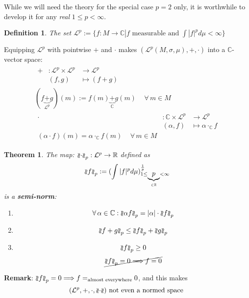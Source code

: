 \documentclass[10pt]{amsart}
\newtheorem{theorem}{Theorem}
\newtheorem{definition}{Definition}
\newcommand\dblwr{\wr\mkern-2mu\wr}
\newcommand{\seminorm}[1]{\mathopen{\dblwr}#1\mathclose{\dblwr}}
\begin{document}
\begin{multicols*}{2}
While we will need the theory for the special case $p=2$ only, it is worthwhile to develop it for any \emph{real} $1 \leq p < \infty$.

\begin{definition}
	The set $\mathcal{L}^p := \lbrace f: M \to \mathbb{C} | f \text{ measurable and } \int |f|^p d\mu < \infty \rbrace$
\end{definition}

Equipping $\mathcal{L}^p$ with pointwise $+$ and $\cdot$ makes $(\mathcal{L}^p(M, \sigma, \mu), +, \cdot)$ into a $\mathbb{C}$-vector space: 
\[
\begin{gathered}
\begin{aligned}
+ & : \mathcal{L}^p \times \mathcal{L}^p & \to \mathcal{L}^p \\
& (f,g) & \mapsto (f + g)
\end{aligned} \\
(f \underbrace{+}_{\mathcal{L}^p} g)(m) := f(m) \underbrace{+}_{\mathbb{C}} g(m) \quad \, \forall \, m \in M \\
\begin{aligned}
	\cdot & : \mathbb{C} \times \mathcal{L}^p & \to \mathcal{L}^p \\
	& (\alpha, f) & \mapsto \alpha \cdot_{\mathbb{C}} f \\
(\alpha \cdot f)(m) = \alpha \cdot_{\mathbb{C}} f(m) \quad \, \forall \, m \in M
\end{aligned}
\end{gathered}
\]

\begin{theorem}
	The map: $ \seminorm{\cdot}_p : \mathcal{L}^p \to \mathbb{R}$ defined as 
	\[
	\seminorm{f}_p := (\int |f|^p d\mu)^{\frac{1}{p} }_{1\leq \underbrace{p}_{\in \mathbb{R}} < \infty}
	\]
	is a \textbf{semi-norm}:
	\begin{enumerate}
		\item[(i)] 
		\[
		\forall \, \alpha \in \mathbb{C}: \seminorm{\alpha f}_p = |\alpha| \cdot \seminorm{f}_p
		\]
		\item[(ii)]
		\[
		\seminorm{ f + g}_p \leq \seminorm{ f }_p + \seminorm{ g}_p
		\]
		\item[(iii)]
		\[
		\seminorm{f}_p \geq 0
		\]
		\[
		\cancel{ \seminorm{f}_p = 0 \Longrightarrow f = 0 }
		\]
	\end{enumerate}
\end{theorem}

\textbf{Remark}: $\seminorm{f}_p = 0 \Longrightarrow f =_{\text{almost everywhere}} 0$, and this makes
\[
(\mathcal{L}^p, +, \cdot, \seminorm{\cdot}) \text{ not even a normed space }
\]


\end{multicols*}
\end{document}
